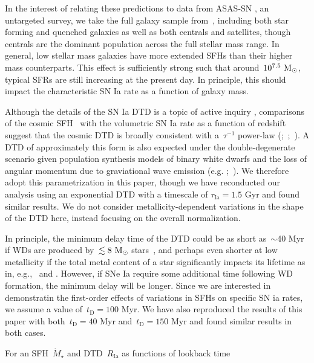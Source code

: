 \documentclass[ms.tex]{subfiles}
\begin{document}
In the interest of relating these predictions to data from ASAS-SN
\citep{Shappee2014, Kochanek2017}, an untargeted survey, we take the full
galaxy sample from~\um, including both star forming and quenched galaxies as
well as both centrals and satellites, though centrals are the dominant
population across the full stellar mass range.
In general, low stellar mass galaxies have more extended SFHs than their
higher mass counterparts.
This effect is sufficiently strong such that around~$10^{7.5}~\text{M}_\odot$, typical
SFRs are still increasing at the present day.
In principle, this should impact the characteristic SN Ia rate as a function of
galaxy mass.
\par
Although the details of the SN Ia DTD is a topic of active inquiry
\citep[e.g.][]{Greggio2005, Strolger2020, Freundlich2021}, comparisons of the
cosmic SFH~\citep[e.g.][]{Hopkins2006, Davies2016, Madau2014, Madau2017,
Driver2018} with the volumetric SN Ia rate as a function of redshift suggest
that the cosmic DTD is broadly consistent with a~$\tau^{-1}$ power-law
(\citealp{Maoz2012a};~\citealp*{Maoz2012b};~\citealp{Graur2013, Graur2014}).
A DTD of approximately this form is also expected under the double-degenerate
scenario given population synthesis models of binary white dwarfs and the loss
of angular momentum due to graviational wave emission (e.g.
\citealp{Mennekens2010};~\citealp*{Maoz2014}).
We therefore adopt this parametrization in this paper, though we have
reconducted our analysis using an exponential DTD with a timescale of
$\tau_\text{Ia} = 1.5$ Gyr and found similar results.
We do not consider metallicity-dependent variations in the shape of the DTD
here, instead focusing on the overall normalization.
\par
In principle, the minimum delay time of the DTD could be as short as~$\sim$40
Myr if WDs are produced by~$\lesssim 8~\text{M}_\odot$ stars~\citep*[e.g.][]{Hurley2000},
and perhaps even shorter at low metallicity if the total metal content of a
star significantly impacts its lifetime as in, e.g.,~\citep{Kodama1997} and
\citet{Vincenzo2016}.
However, if SNe Ia require some additional time following WD formation, the
minimum delay will be longer.
Since we are interested in demonstratin the first-order effects of variations
in SFHs on specific SN ia rates, we assume a value of~$t_\text{D} = 100$ Myr.
We have also reproduced the results of this paper with both~$t_\text{D} = 40$
Myr and~$t_\text{D} = 150$ Myr and found similar results in both cases.
\par
For an SFH~$\dot{M}_\star$ and DTD~$R_\text{Ia}$ as functions of lookback time
\end{document}
